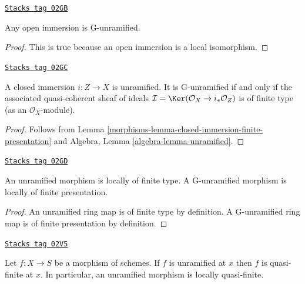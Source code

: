 \begin{lemma}
\label{morphisms-lemma-open-immersion-unramified}
\href{https://stacks.math.columbia.edu/tag/02GB}{\texttt{Stacks tag 02GB}}

Any open immersion is G-unramified.
\end{lemma}

\begin{proof}
This is true because an open immersion is a local isomorphism.
\end{proof}

\begin{lemma}
\label{morphisms-lemma-closed-immersion-unramified}
\href{https://stacks.math.columbia.edu/tag/02GC}{\texttt{Stacks tag 02GC}}

A closed immersion $i : Z \to X$ is unramified.
It is G-unramified if and only if the associated quasi-coherent sheaf of
ideals $\mathcal{I} = \Ker(\mathcal{O}_X \to i_*\mathcal{O}_Z)$
is of finite type (as an $\mathcal{O}_X$-module).
\end{lemma}

\begin{proof}

Follows from Lemma \ref{morphisms-lemma-closed-immersion-finite-presentation} and
Algebra, Lemma \ref{algebra-lemma-unramified}.
\end{proof}

\begin{lemma}
\label{morphisms-lemma-unramified-locally-finite-type}
\href{https://stacks.math.columbia.edu/tag/02GD}{\texttt{Stacks tag 02GD}}

An unramified morphism is locally of finite type.
A G-unramified morphism is locally of finite presentation.
\end{lemma}

\begin{proof}
An unramified ring map is of finite type by definition.
A G-unramified ring map is of finite presentation by definition.
\end{proof}

\begin{lemma}
\label{morphisms-lemma-unramified-quasi-finite}
\href{https://stacks.math.columbia.edu/tag/02V5}{\texttt{Stacks tag 02V5}}

Let $f : X \to S$ be a morphism of schemes.
If $f$ is unramified at $x$ then $f$ is quasi-finite at $x$.
In particular, an unramified morphism is locally quasi-finite.
\end{lemma}

